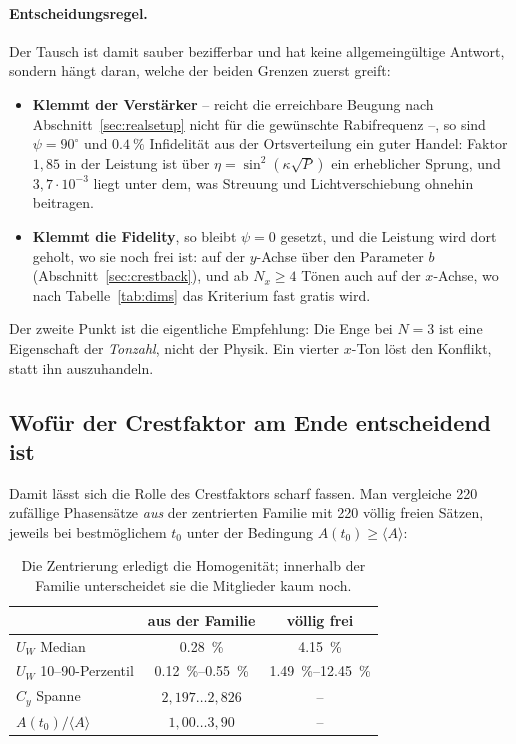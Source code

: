 \documentclass[11pt,a4paper]{article}
\newcommand{\crest}{\ensuremath{C}}
\newcommand{\Uw}{\ensuremath{U_W}}
\begin{document}
\paragraph{Entscheidungsregel.}
Der Tausch ist damit sauber bezifferbar und hat keine allgemeingültige
Antwort, sondern hängt daran, welche der beiden Grenzen zuerst greift:

\begin{itemize}
  \item \textbf{Klemmt der Verstärker} -- reicht die erreichbare Beugung
    nach Abschnitt~\ref{sec:realsetup} nicht für die gewünschte
    Rabifrequenz --, so sind $\psi=90^\circ$ und $\SI{0.4}{\percent}$
    Infidelität aus der Ortsverteilung ein guter Handel: Faktor $1{,}85$ in
    der Leistung ist über $\eta=\sin^2(\kappa\sqrt{P})$ ein erheblicher
    Sprung, und $3{,}7\cdot10^{-3}$ liegt unter dem, was Streuung und
    Lichtverschiebung ohnehin beitragen.
  \item \textbf{Klemmt die Fidelity}, so bleibt $\psi=0$ gesetzt, und die
    Leistung wird dort geholt, wo sie noch frei ist: auf der $y$-Achse über
    den Parameter $b$ (Abschnitt~\ref{sec:crestback}), und ab $N_x\ge4$
    Tönen auch auf der $x$-Achse, wo nach Tabelle~\ref{tab:dims} das
    Kriterium fast gratis wird.
\end{itemize}

\noindent Der zweite Punkt ist die eigentliche Empfehlung: Die Enge bei
$N=3$ ist eine Eigenschaft der \emph{Tonzahl}, nicht der Physik. Ein
vierter $x$-Ton löst den Konflikt, statt ihn auszuhandeln.

\subsection{Wofür der Crestfaktor am Ende entscheidend ist}

Damit lässt sich die Rolle des Crestfaktors scharf fassen. Man vergleiche
\num{220} zufällige Phasensätze \emph{aus} der zentrierten Familie mit
\num{220} völlig freien Sätzen, jeweils bei bestmöglichem $t_0$ unter der
Bedingung $A(t_0)\ge\langle A\rangle$:

\begin{table}[htb]
  \centering
  \caption{Die Zentrierung erledigt die Homogenität; innerhalb der Familie
  unterscheidet sie die Mitglieder kaum noch.}
  \label{tab:decisive}
  \begin{tabular}{lcc}
    \toprule
     & aus der Familie & völlig frei\\
    \midrule
    $\Uw$ Median                 & \SI{0.28}{\percent} & \SI{4.15}{\percent}\\
    $\Uw$ 10--90-Perzentil       & \SIrange{0.12}{0.55}{\percent} & \SIrange{1.49}{12.45}{\percent}\\
    $\crest_y$ Spanne            & $2{,}197 \dots 2{,}826$ & --\\
    $A(t_0)/\langle A\rangle$    & $1{,}00 \dots 3{,}90$ & --\\
    \bottomrule
  \end{tabular}
\end{table}
\end{document}
